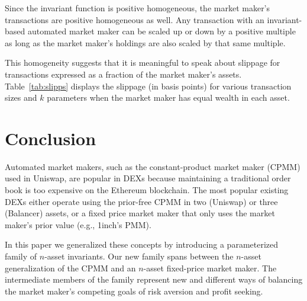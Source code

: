 \documentclass[11pt]{article}
\begin{document}
Since the invariant function is positive homogeneous, the market maker's transactions are positive homogeneous as well. Any transaction with an invariant-based automated market maker can be scaled up or down by a positive multiple as long as the market maker's holdings are also scaled by that same multiple.

This homogeneity suggests that it is meaningful to speak about slippage for transactions expressed as a fraction of the market maker's assets. Table~\ref{tab:slipps} displays the slippage (in basis points) for various transaction sizes and $k$ parameters when the market maker has equal wealth in each asset.

\section{Conclusion}

Automated market makers, such as the constant-product market maker (CPMM) used in Uniswap, are popular in DEXs because maintaining a traditional order book is too expensive on the Ethereum blockchain.
%
The most popular existing DEXs either operate using the prior-free CPMM in two (Uniswap) or three (Balancer) assets, or a fixed price market maker that only uses the market maker's prior value (e.g., 1inch's PMM). 

In this paper we generalized these concepts by introducing a parameterized family of $n$-asset invariants. Our new family spans between the $n$-asset generalization of the CPMM and an $n$-asset fixed-price market maker. The intermediate members of the family represent new and different ways of balancing the market maker's competing goals of risk aversion and profit seeking.

\clearpage


\end{document}
